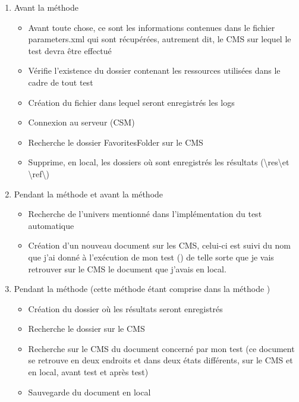 \begin{enumerate}
	\item Avant la m\'{e}thode 
	\begin{itemize}
		\item Avant toute chose, ce sont les informations contenues dans le fichier parameters.xml qui sont r\'{e}cup\'{e}r\'{e}es, autrement dit, le \gls{CMS} sur lequel le test devra \^{e}tre effectu\'{e}
		\item V\'{e}rifie l'existence du dossier contenant les ressources utilis\'{e}es dans le cadre de tout test
		\item Cr\'{e}ation du fichier dans lequel seront enregistr\'{e}s les logs 
		\item Connexion au serveur (CSM)
		\item Recherche le dossier FavoritesFolder sur le \gls{CMS}
		\item Supprime, en local, les dossiers o\`{u} sont enregistr\'{e}s les r\'{e}sultats (\textbackslash res\textbackslash  et \textbackslash ref\textbackslash )
		
	\end{itemize}
	\item Pendant la m\'{e}thode  et avant la m\'{e}thode 
	\begin{itemize}
		\item Recherche de l'univers mentionn\'{e} dans l'impl\'{e}mentation du test automatique
		\item Cr\'{e}ation d'un nouveau document sur les \gls{CMS}, celui-ci est suivi du nom que j'ai donn\'{e} \`{a} l'ex\'{e}cution de mon test () de telle sorte que je vais retrouver sur le \gls{CMS} le document que j'avais en local.
	\end{itemize}
	\item Pendant la m\'{e}thode  (cette m\'{e}thode \'{e}tant comprise dans la m\'{e}thode )
	\begin{itemize}
		\item Cr\'{e}ation du dossier o\`{u} les r\'{e}sultats seront enregistr\'{e}s
		\item Recherche le dossier  sur le \gls{CMS}
		\item Recherche sur le \gls{CMS} du document concern\'{e} par mon test (ce document se retrouve en deux endroits et dans deux \'{e}tats diff\'{e}rents, sur le \gls{CMS} et en local, avant test et apr\`{e}s test)
		\item Sauvegarde du document en local
		

\end{itemize}
\end{enumerate}
